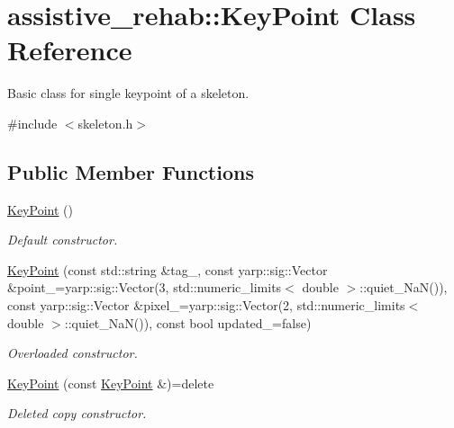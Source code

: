 \section{assistive\+\_\+rehab\+:\+:Key\+Point Class Reference}
\label{classassistive__rehab_1_1KeyPoint}


Basic class for single keypoint of a skeleton.  




{\ttfamily \#include $<$skeleton.\+h$>$}

\subsection*{Public Member Functions}
\begin{DoxyCompactItemize}
\item 
\mbox{\label{classassistive__rehab_1_1KeyPoint_a8b4ce35fc2c7101f1135b9c7530f053d}} 
\hyperlink{classassistive__rehab_1_1KeyPoint_a8b4ce35fc2c7101f1135b9c7530f053d}{Key\+Point} ()
\begin{DoxyCompactList}\small\item\em Default constructor. \end{DoxyCompactList}\item 
\hyperlink{classassistive__rehab_1_1KeyPoint_ad146e6b6fe96ae4eeaa9d4fa8eaebb40}{Key\+Point} (const std\+::string \&tag\+\_\+, const yarp\+::sig\+::\+Vector \&point\+\_\+=yarp\+::sig\+::\+Vector(3, std\+::numeric\+\_\+limits$<$ double $>$\+::quiet\+\_\+\+NaN()), const yarp\+::sig\+::\+Vector \&pixel\+\_\+=yarp\+::sig\+::\+Vector(2, std\+::numeric\+\_\+limits$<$ double $>$\+::quiet\+\_\+\+NaN()), const bool updated\+\_\+=false)
\begin{DoxyCompactList}\small\item\em Overloaded constructor. \end{DoxyCompactList}\item 
\mbox{\label{classassistive__rehab_1_1KeyPoint_add33d1e673dcbae72449b6843482c6e9}} 
\hyperlink{classassistive__rehab_1_1KeyPoint_add33d1e673dcbae72449b6843482c6e9}{Key\+Point} (const \hyperlink{classassistive__rehab_1_1KeyPoint}{Key\+Point} \&)=delete
\begin{DoxyCompactList}\small\item\em Deleted copy constructor. \end{DoxyCompactList}\item 
\mbox{\label{classassistive__rehab_1_1KeyPoint_aecdf117e438bedb51734c7d2730e6d61}} 

\end{DoxyCompactItemize}
